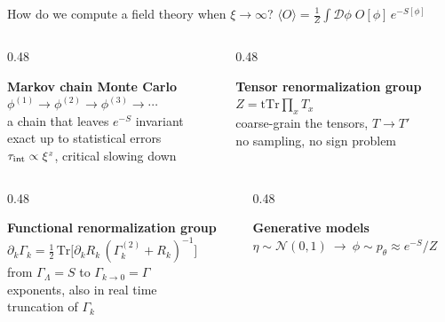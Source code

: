 \documentclass[11pt,t]{beamer}
\newcommand{\kb}[1]{{\bfseries\color{Kleinblue} #1}}
\begin{document}
\begin{frame}{How do we compute a field theory when $\xi\to\infty$?}
  \centering\small
  $\displaystyle\langle O\rangle=\frac{1}{Z}\int\mathcal{D}\phi\;O[\phi]\,e^{-S[\phi]}$\par
  \vspace{1em}
  \begin{columns}[T,onlytextwidth]
    \begin{column}{0.48\textwidth}
      \footnotesize\raggedright
      \kb{Markov chain Monte Carlo}\\[0.2em]
      $\phi^{(1)}\to\phi^{(2)}\to\phi^{(3)}\to\cdots$\\
      a chain that leaves $e^{-S}$ invariant\\
      exact up to statistical errors\\
      \alert{$\tau_{\rm int}\propto\xi^{z}$}, critical slowing down
    \end{column}
    \begin{column}{0.48\textwidth}
      \footnotesize\raggedright
      \kb{Tensor renormalization group}\\[0.2em]
      $Z=\mathrm{tTr}\prod_xT_x$\\
      coarse-grain the tensors, $T\to T'$\\
      no sampling, no sign problem
    \end{column}
  \end{columns}
  \vspace{1.4em}
  \begin{columns}[T,onlytextwidth]
    \begin{column}{0.48\textwidth}
      \footnotesize\raggedright
      \kb{Functional renormalization group}\\[0.2em]
      $\partial_k\Gamma_k=\tfrac12\,\mathrm{Tr}\big[\partial_kR_k\,(\Gamma_k^{(2)}+R_k)^{-1}\big]$\\
      from $\Gamma_\Lambda=S$ to $\Gamma_{k\to0}=\Gamma$\\
      exponents, also in real time\\
      \alert{truncation of $\Gamma_k$}
    \end{column}
    \begin{column}{0.48\textwidth}
      \footnotesize\raggedright
      \kb{Generative models}\\[0.2em]
      $\eta\sim\mathcal N(0,1)\ \to\ \phi\sim p_\theta\approx e^{-S}/Z$\\

\end{column}
\end{columns}
\end{frame}
\end{document}
